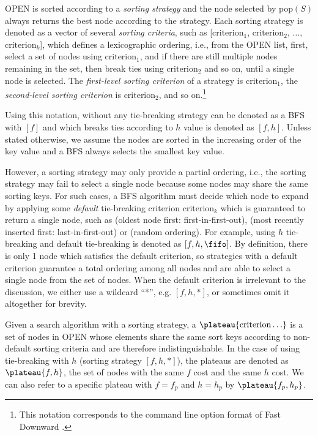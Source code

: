 OPEN is sorted according to a \emph{sorting strategy} and the node selected by pop$(S)$ always returns the best node according to the strategy.
Each sorting strategy is denoted as a vector of several \emph{sorting criteria}, such as
[$\text{criterion}_1$, $\text{criterion}_2$, $\ldots$,
$\text{criterion}_k$], which defines a lexicographic ordering, 
i.e., from the OPEN list, first, select a
set of nodes using $\text{criterion}_1$, and if there are still multiple
nodes remaining in the set, then break ties using $\text{criterion}_2$
and so on, until a single node is selected.  The \emph{first-level
sorting criterion} of a strategy is $\text{criterion}_1$, the
\emph{second-level sorting criterion} is $\text{criterion}_2$, and so on.\footnote{This notation corresponds to the command line option format of Fast
Downward \cite{Helmert2006}.} %


Using this notation, \astar without any tie-breaking strategy can be
denoted as a BFS with $[f]$ and \astar which breaks ties according to $h$
value is denoted as $[f,h]$.
Unless stated otherwise, we assume the nodes are sorted in the
increasing order of the key value and a BFS always selects the smallest
key value.

However, a sorting strategy may only provide a partial ordering, 
i.e., the sorting strategy may fail to select a single node because some nodes
may share the same sorting keys.
For such cases, a BFS algorithm must
decide which node to expand by applying some \emph{default} tie-breaking
criterion $\text{criterion}_k$ which is guaranteed to return a single node, such as  \fifo (oldest node first: first-in-first-out), \lifo
(most recently inserted first: last-in-first-out) or \ro (random ordering).
For example, \astar using $h$ tie-breaking and \fifo default tie-breaking
 is denoted as $[f,h,\fifo]$.
By definition, there is only 1 node which satisfies the default criterion, so
strategies with a default criterion guarantee a total ordering among all nodes and
are able to select a single node from the set of nodes.
When the default criterion is irrelevant to the discussion,
we either use a wildcard ``*'', e.g. $[f,h,*]$, or sometimes omit it altogether for brevity.

Given a search algorithm with a sorting strategy, 
a $\plateau{\text{criterion}\ldots}$ is a set of nodes in OPEN whose elements share
the same sort keys according to non-default sorting criteria and are therefore
indistinguishable. In the case of \astar
using tie-breaking with $h$ (sorting strategy $[f,h,*]$), the plateaus are denoted as
$\plateau{f,h}$, the set of nodes with the same $f$ cost and the same $h$ cost.
We can also refer to a specific plateau with $f=f_p$ and $h=h_p$ by $\plateau{f_p,h_p}$.

